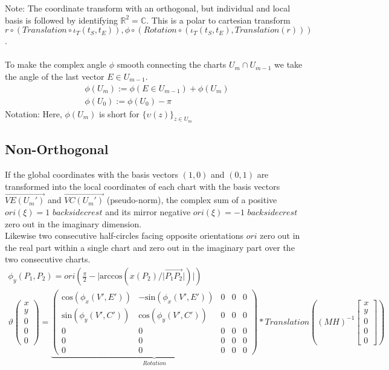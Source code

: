 \documentclass{report}
\begin{document}
Note: The coordinate transform with an orthogonal, but individual and local basis is followed by identifying $\mathbb{R}^2=\mathbb{C}$. This is a polar to cartesian transform $r\circ (Translation\circ \iota_{T}(t_{S},t_{E})),\phi \circ (Rotation\circ (\iota_{T}(t_{S},t_{E}),Translation(r)))$.\\\\
To make the complex angle $\phi$ smooth connecting the charts $U_{m}\cap U_{m-1}$ we take the angle of the last vector $E\in U_{m-1}$.
\begin{align}
\phi (U_{m}) := \phi (E \in U_{m-1})+\phi(U_{m})\\
\phi (U_{0}):=\phi(U_{0}) -\pi
\end{align}
Notation: Here, $\phi (U_{m})$ is short for $\{\upsilon (z) \}_{z \in U_{m}}$
\subsection{Non-Orthogonal}
If the global coordinates with the basis vectors $(1,0)$ and $(0,1)$ are transformed into the local coordinates of each chart with the basis vectors $\overrightarrow{VE(U_{m}')}$ and $\overrightarrow{VC(U_{m}')}$ (pseudo-norm), the complex sum of a positive $ori(\xi)=1$ $backsidecrest$ and its mirror negative $ori(\xi)=-1$ $backsidecrest$ zero out in the imaginary dimension.\\
Likewise two consecutive half-circles facing opposite orientations $ori$ zero out in the real part within a single chart and zero out in the imaginary part over the two consecutive charts.
\begin{align}
\phi_{y}(P_{1},P_{2}) = ori(\frac{\pi}{2}-\lvert \mathrm{arccos}(x(P_{2})/\lvert \overrightarrow{P_{1}P_{2}}\rvert)\rvert)\\
\vartheta
\begin{pmatrix}x \\ y \\ 0 \\ 0 \\ 0\end{pmatrix}=
\underbrace{
\begin{pmatrix}
\mathrm{cos}(\phi_{x}(V',E')) & -\mathrm{sin}(\phi_{x}(V',E')) & 0 & 0 & 0 \\
\mathrm{sin}(\phi_{y}(V',C')) & \mathrm{cos}(\phi_{y}(V',C')) & 0 & 0 & 0 \\
0 & 0 & 0 & 0 & 0 \\
0 & 0 & 0 & 0 & 0 \\
0 & 0 & 0 & 0 & 0
\end{pmatrix}
}_{Rotation}*
Translation((MH)^{-1}\begin{bmatrix} x \\ y \\ 0 \\ 0 \\ 0 \end{bmatrix})
\end{align}
\end{document}
